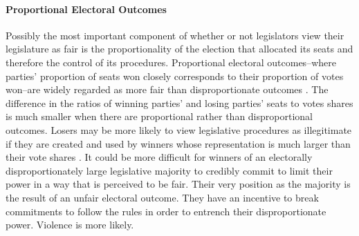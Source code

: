 \documentclass[a4paper]{article}\usepackage[]{graphicx}\usepackage[]{color}
\begin{document}
\paragraph{Proportional Electoral Outcomes}

Possibly the most important component of whether or not legislators view their legislature as fair is the proportionality of the election that allocated its seats and therefore the control of its procedures. Proportional electoral outcomes--where parties' proportion of seats won closely corresponds to their proportion of votes won--are widely regarded as more fair than disproportionate outcomes \citep{norris1997}. The difference in the ratios of winning parties' and losing parties' seats to votes shares is much smaller when there are proportional rather than disproportional outcomes. Losers may be more likely to view legislative procedures as illegitimate if they are created and used by winners whose representation is much larger than their vote shares \citep[see][]{lijphart1999}. It could be more difficult for winners of an electorally disproportionately large legislative majority to credibly commit to limit their power in a way that is perceived to be fair. Their very position as the majority is the result of an unfair electoral outcome. They have an incentive to break commitments to follow the rules in order to entrench their disproportionate power. Violence is more likely.
\end{document}
